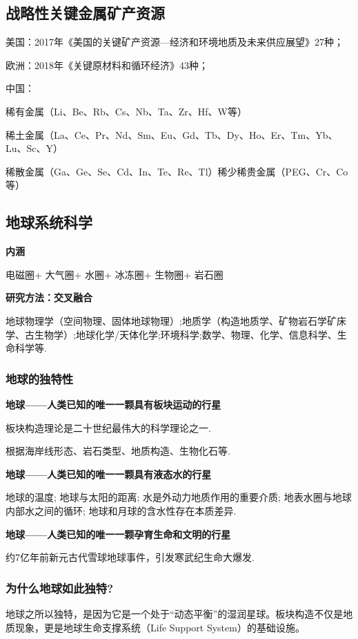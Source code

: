 \documentclass[12pt,a4paper]{article}
\begin{document}
	\subsection{战略性关键金属矿产资源}
	美国：2017年《美国的关键矿产资源—经济和环境地质及未来供应展望》27种；
	
	欧洲：2018年《关键原材料和循环经济》43种；
	
	中国：
	
	稀有金属（Li、Be、Rb、Cs、Nb、Ta、Zr、Hf、W等）
	
	稀土金属（La、Ce、Pr、Nd、Sm、Eu、Gd、Tb、Dy、Ho、Er、Tm、Yb、Lu、Sc、Y）
	
	稀散金属（Ga、Ge、Se、Cd、In、Te、Re、Tl）稀少稀贵金属（PEG、Cr、Co等）
	\subsection{地球系统科学}
	\textbf{内涵}
	
	电磁圈+ 大气圈+ 水圈+ 冰冻圈+ 生物圈+ 岩石圈
	
	\textbf{研究方法：交叉融合}
	
	地球物理学（空间物理、固体地球物理）;地质学（构造地质学、矿物岩石学矿床学、古生物学）;地球化学/天体化学;环境科学;数学、物理、化学、信息科学、生命科学等.
	
	\subsubsection{地球的独特性}
	
	\textbf{地球——人类已知的唯一一颗具有板块运动的行星}
	
	板块构造理论是二十世纪最伟大的科学理论之一.
	
	根据海岸线形态、岩石类型、地质构造、生物化石等.
	
	\textbf{地球——人类已知的唯一一颗具有液态水的行星}
	
	地球的温度;
	地球与太阳的距离;
	水是外动力地质作用的重要介质;
	地表水圈与地球内部水之间的循环;
	地球和月球的含水性存在本质差异.
	
	\textbf{地球——人类已知的唯一一颗孕育生命和文明的行星}
	
	约7亿年前新元古代雪球地球事件，引发寒武纪生命大爆发.
	\subsubsection{为什么地球如此独特?}
	地球之所以独特，是因为它是一个处于“动态平衡”的湿润星球。板块构造不仅是地质现象，更是地球生命支撑系统（Life Support System）的基础设施。
	
\end{document}

